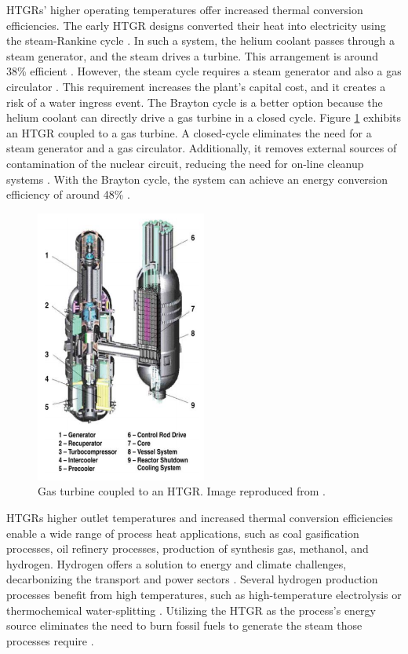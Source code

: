 HTGRs' higher operating temperatures offer increased thermal conversion efficiencies.
The early \gls{HTGR} designs converted their heat into electricity using the steam-Rankine cycle \cite{herranz_power_2009}.
In such a system, the helium coolant passes through a steam generator, and the steam drives a turbine.
This arrangement is around 38\% efficient \cite{breeze_nuclear_2014}.
However, the steam cycle requires a steam generator and also a gas circulator \cite{no_review_2007}.
This requirement increases the plant's capital cost, and it creates a risk of a water ingress event.
The Brayton cycle is a better option because the helium coolant can directly drive a gas turbine in a closed cycle.
Figure \ref{fig:gt-mhr} exhibits an HTGR coupled to a gas turbine.
A closed-cycle eliminates the need for a steam generator and a gas circulator.
Additionally, it removes external sources of contamination of the nuclear circuit, reducing the need for on-line cleanup systems \cite{iaea_current_2001}.
With the Brayton cycle, the system can achieve an energy conversion efficiency of around 48\% \cite{breeze_nuclear_2014}.

\begin{figure}[htbp!]
	\centering
	\includegraphics[height=9.0cm]{figures/gt-mhr3}
	\caption{Gas turbine coupled to an HTGR. Image reproduced from \cite{baxi_evaluation_2008}.}
	\label{fig:gt-mhr}
\end{figure}

HTGRs higher outlet temperatures and increased thermal conversion efficiencies enable a wide range of process heat applications, such as coal gasification processes, oil refinery processes, production of synthesis gas, methanol, and hydrogen.
Hydrogen offers a solution to energy and climate challenges, decarbonizing the transport and power sectors \cite{nagashima_japans_2018}.
Several hydrogen production processes benefit from high temperatures, such as high-temperature electrolysis \cite{doenitz_hydrogen_1980} or thermochemical water-splitting \cite{yildiz_efficiency_2006}.
Utilizing the \gls{HTGR} as the process's energy source eliminates the need to burn fossil fuels to generate the steam those processes require \cite{iaea_current_2001}.

